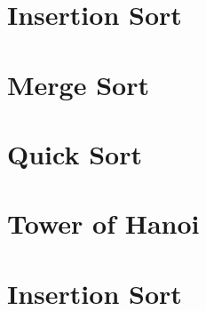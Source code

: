 
\section*{\Huge\bfseries}

\section{Insertion Sort}
\section{Merge Sort}
\section{Quick Sort}
\section{Tower of Hanoi}
\section{Insertion Sort}

